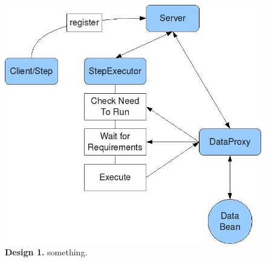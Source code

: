 \begin{figure}[htbp]
	\begin{center}
		\includegraphics[scale=0.6]{pics/programOrganisationOverview3ScaledWithAlpha.jpg}
	\caption[Design 1]{
	\textbf{Design 1.}
	something. }
	\end{center}
	\label{fig:programOrganisationOverview3ScaledWithAlpha}
\end{figure}